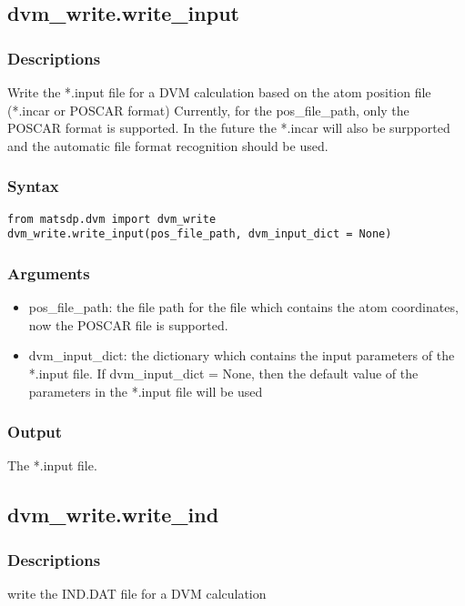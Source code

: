 \documentclass[12pt]{book}
\begin{document}
\subsection{dvm\_write.write\_input}
\subsubsection{Descriptions}
Write the *.input file for a DVM calculation based on the atom position file (*.incar or POSCAR format)
Currently, for the pos\_file\_path, only the POSCAR format is supported. In the future the *.incar will also be surpported and the automatic file format recognition should be used.

\subsubsection{Syntax}
\begin{lstlisting}
from matsdp.dvm import dvm_write
dvm_write.write_input(pos_file_path, dvm_input_dict = None)
\end{lstlisting}

\subsubsection{Arguments}

\begin{itemize}
\item pos\_file\_path: the file path for the file which contains the atom coordinates, now the POSCAR file is supported.
\item dvm\_input\_dict: the dictionary which contains the input parameters of the *.input file. If dvm\_input\_dict = None, then the default value of the parameters in the *.input file will be used
\end{itemize}


\subsubsection{Output}

The *.input file.

\subsection{dvm\_write.write\_ind}
\subsubsection{Descriptions}
write the IND.DAT file for a DVM calculation
\end{document}
